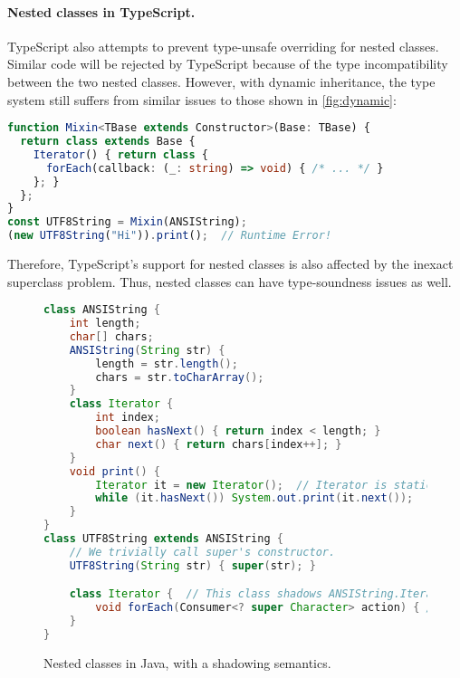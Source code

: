 \paragraph{Nested classes in TypeScript.}
TypeScript also attempts to prevent type-unsafe overriding for nested classes.
Similar code will be rejected by TypeScript because of the type incompatibility
between the two nested classes. However, with dynamic inheritance, the type
system still suffers from similar issues to those shown in
\autoref{fig:dynamic}:
\begin{lstlisting}[language=TypeScript]
function Mixin<TBase extends Constructor>(Base: TBase) {
  return class extends Base {
    Iterator() { return class {
      forEach(callback: (_: string) => void) { /* ... */ }
    }; }
  };
}
const UTF8String = Mixin(ANSIString);
(new UTF8String("Hi")).print();  // Runtime Error!
\end{lstlisting}
\noindent Therefore, TypeScript's support for nested classes is also affected by
the inexact superclass problem. Thus, nested classes can have type-soundness
issues as well.

\begin{figure}
\begin{lstlisting}[language=Java]
class ANSIString {
    int length;
    char[] chars;
    ANSIString(String str) {
        length = str.length();
        chars = str.toCharArray();
    }
    class Iterator {
        int index;
        boolean hasNext() { return index < length; }
        char next() { return chars[index++]; }
    }
    void print() {
        Iterator it = new Iterator();  // Iterator is statically bound.
        while (it.hasNext()) System.out.print(it.next());
    }
}
class UTF8String extends ANSIString {
    // We trivially call super's constructor.
    UTF8String(String str) { super(str); }

    class Iterator {  // This class shadows ANSIString.Iterator.
        void forEach(Consumer<? super Character> action) { /* ... */ }
    }
}
\end{lstlisting}
\caption{Nested classes in Java, with a shadowing semantics.}
\label{fig:nested_shadow}
\end{figure}

